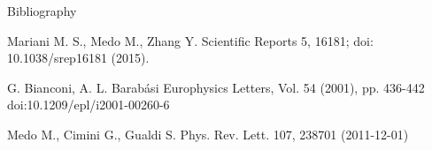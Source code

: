 \begin{frame}{Bibliography}
    \begin{thebibliography}{4}
            Mariani M. S., Medo M., Zhang Y.
            \newblock Scientific Reports 5, 16181;
            \newblock doi: 10.1038/srep16181 (2015).

            G. Bianconi, A. L. Barabási
            \newblock Europhysics Letters, Vol. 54 (2001), pp. 436-442
            \newblock doi:10.1209/epl/i2001-00260-6

            Medo M., Cimini G., Gualdi S.
            \newblock Phys. Rev. Lett. 107, 238701 (2011-12-01)
    \end{thebibliography}
\end{frame}
